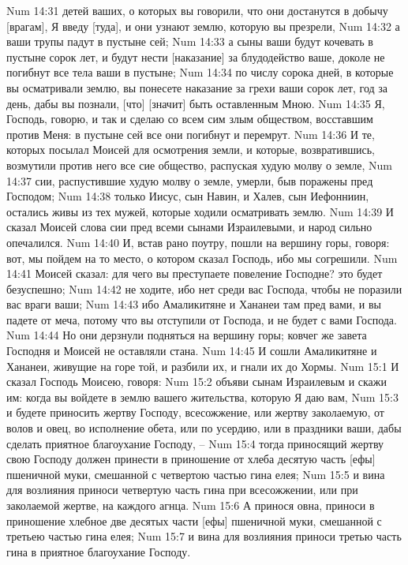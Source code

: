 Num 14:31  детей ваших, о которых вы говорили, что они достанутся в добычу [врагам], Я введу [туда], и они узнают землю, которую вы презрели,
Num 14:32  а ваши трупы падут в пустыне сей;
Num 14:33  а сыны ваши будут кочевать в пустыне сорок лет, и будут нести [наказание] за блудодейство ваше, доколе не погибнут все тела ваши в пустыне;
Num 14:34  по числу сорока дней, в которые вы осматривали землю, вы понесете наказание за грехи ваши сорок лет, год за день, дабы вы познали, [что] [значит] быть оставленным Мною.
Num 14:35  Я, Господь, говорю, и так и сделаю со всем сим злым обществом, восставшим против Меня: в пустыне сей все они погибнут и перемрут.
Num 14:36  И те, которых посылал Моисей для осмотрения земли, и которые, возвратившись, возмутили против него все сие общество, распуская худую молву о земле,
Num 14:37  сии, распустившие худую молву о земле, умерли, быв поражены пред Господом;
Num 14:38  только Иисус, сын Навин, и Халев, сын Иефонниин, остались живы из тех мужей, которые ходили осматривать землю.
Num 14:39  И сказал Моисей слова сии пред всеми сынами Израилевыми, и народ сильно опечалился.
Num 14:40  И, встав рано поутру, пошли на вершину горы, говоря: вот, мы пойдем на то место, о котором сказал Господь, ибо мы согрешили.
Num 14:41  Моисей сказал: для чего вы преступаете повеление Господне? это будет безуспешно;
Num 14:42  не ходите, ибо нет среди вас Господа, чтобы не поразили вас враги ваши;
Num 14:43  ибо Амаликитяне и Хананеи там пред вами, и вы падете от меча, потому что вы отступили от Господа, и не будет с вами Господа.
Num 14:44  Но они дерзнули подняться на вершину горы; ковчег же завета Господня и Моисей не оставляли стана.
Num 14:45  И сошли Амаликитяне и Хананеи, живущие на горе той, и разбили их, и гнали их до Хормы.
Num 15:1  И сказал Господь Моисею, говоря:
Num 15:2  объяви сынам Израилевым и скажи им: когда вы войдете в землю вашего жительства, которую Я даю вам,
Num 15:3  и будете приносить жертву Господу, всесожжение, или жертву заколаемую, от волов и овец, во исполнение обета, или по усердию, или в праздники ваши, дабы сделать приятное благоухание Господу, --
Num 15:4  тогда приносящий жертву свою Господу должен принести в приношение от хлеба десятую часть [ефы] пшеничной муки, смешанной с четвертою частью гина елея;
Num 15:5  и вина для возлияния приноси четвертую часть гина при всесожжении, или при заколаемой жертве, на каждого агнца.
Num 15:6  А принося овна, приноси в приношение хлебное две десятых части [ефы] пшеничной муки, смешанной с третьею частью гина елея;
Num 15:7  и вина для возлияния приноси третью часть гина в приятное благоухание Господу.
